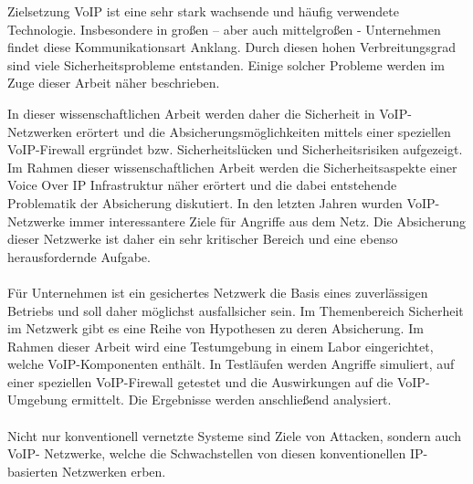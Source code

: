 \DIFdelbegin %
\DIFdelend \DIFaddbegin \label{Zielsetzung}
\begin{section}{Zielsetzung}	
		\ac{VoIP} \DIFaddend ist eine sehr stark wachsende und häufig verwendete Technologie.
		Insbesondere in großen – aber auch mittelgroßen - Unternehmen findet diese Kommunikationsart Anklang.
		Durch diesen hohen Verbreitungsgrad sind viele Sicherheitsprobleme entstanden.
		Einige solcher Probleme werden im Zuge dieser Arbeit näher beschrieben.\\
		\DIFaddbegin 

		\DIFaddend In dieser wissenschaftlichen Arbeit werden daher die Sicherheit in VoIP-Netzwerken erörtert 
		und die Absicherungsmöglichkeiten mittels einer speziellen VoIP-Firewall ergründet bzw. 
		Sicherheitslücken und Sicherheitsrisiken aufgezeigt.
	\DIFdelbegin %
\DIFdelend \DIFaddbegin \\
		\DIFaddend Im Rahmen dieser wissenschaftlichen Arbeit werden die Sicherheitsaspekte einer 
		Voice Over IP Infrastruktur näher erörtert und die dabei entstehende Problematik der Absicherung diskutiert.
		In den letzten Jahren wurden VoIP-Netzwerke immer interessantere Ziele für Angriffe aus dem Netz.
		Die Absicherung dieser Netzwerke ist daher ein sehr kritischer Bereich und eine ebenso herausfordernde Aufgabe.\\
	\DIFaddbegin \\
		\DIFaddend Für Unternehmen ist ein gesichertes Netzwerk die Basis eines zuverlässigen Betriebs und 
		soll daher möglichst ausfallsicher sein.
		Im Themenbereich Sicherheit im Netzwerk gibt es eine Reihe von Hypothesen zu deren Absicherung.
	 	Im Rahmen dieser Arbeit wird eine Testumgebung in einem Labor eingerichtet, 
		welche VoIP-Komponenten enthält. In Testläufen werden Angriffe simuliert, 
		auf einer speziellen VoIP-Firewall getestet und die Auswirkungen auf die VoIP-Umgebung ermittelt.
		Die Ergebnisse werden anschließend analysiert.\\
	\\
		Nicht nur konventionell vernetzte Systeme sind Ziele von Attacken, sondern auch VoIP- Netzwerke,
		welche die Schwachstellen von diesen konventionellen IP-basierten Netzwerken erben.

\end{section}
